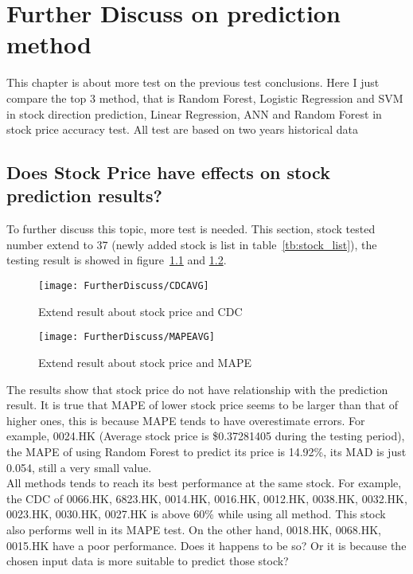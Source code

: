 \chapter{Further Discuss on prediction method}
\label{ch:futuerDiscuss}


This chapter is about more test on the previous test conclusions. Here I just compare the top 3 method, that is Random Forest, Logistic Regression and SVM in stock direction prediction, Linear Regression, ANN and Random Forest in stock price accuracy test. All test are based on two years historical data

\section{Does Stock Price have effects on stock prediction results?}
\label{sec:priceInfluence}
To further discuss this topic, more test is needed. This section, stock tested number extend to 37 (newly added stock is list in table~\ref{tb:stock_list}), the testing result is showed in figure~\ref{fg:furtherCDC} and \ref{fg:furtherMAPE}. 


\begin{figure}[h]
	\centering
	\texttt{[image: FurtherDiscuss/CDCAVG]}
	\caption{Extend result about stock price and CDC}
	\label{fg:furtherCDC}
\end{figure}


\begin{figure}[h]
	\centering
	\texttt{[image: FurtherDiscuss/MAPEAVG]}
	\caption{Extend result about stock price and MAPE}
	\label{fg:furtherMAPE}
\end{figure}
\clearpage

The results show that stock price do not have relationship with the prediction result. It is true that MAPE of lower stock price seems to be larger than that of higher ones, this is because MAPE tends to have overestimate errors. For example, 0024.HK (Average stock price is \$0.37281405 during the testing period), the MAPE of using Random Forest to predict its price is 14.92\%, its MAD is just 0.054, still a very small value.\\


All methods tends to reach its best performance at the same stock. For example, the CDC of 0066.HK, 6823.HK, 0014.HK, 0016.HK, 0012.HK, 0038.HK, 0032.HK, 0023.HK, 0030.HK, 0027.HK is above 60\% while using all method. This stock also performs well in its MAPE test. On the other hand, 0018.HK, 0068.HK, 0015.HK have a poor performance. Does it happens to be so? Or it is because the chosen input data is more suitable to predict those stock?


